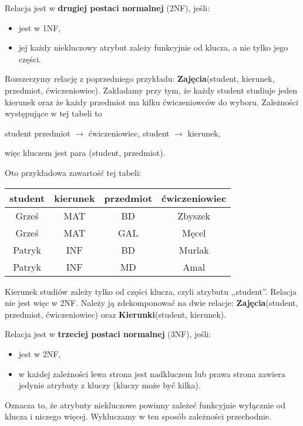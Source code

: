 Relacja jest w \textbf{drugiej postaci normalnej} (2NF), jeśli:
\begin{itemize}
    \item jest w 1NF,
    \item jej każdy niekluczowy atrybut zależy funkcyjnie od  klucza, a nie tylko jego części.
\end{itemize}

\begin{example}
Rozszerzymy relację z poprzedniego przykładu: \textbf{Zajęcia}(student, kierunek, przedmiot, ćwiczeniowiec). Zakładamy przy tym, że każdy student studiuje jeden kierunek oraz że każdy przedmiot ma kilku ćwiczeniowców do wyboru. Zależności występujące w tej tabeli to
\begin{center}
    student przedmiot $\to$ ćwiczeniowiec,
    \qquad student $\to$ kierunek,
\end{center}
więc kluczem jest para (student, przedmiot).

Oto przykładowa zawartość tej tabeli:
\begin{center}
    \begin{tabular}{c|c|c|c}
     student & kierunek & przedmiot & ćwiczeniowiec \\
     \hline
     Grześ & MAT & BD & Zbyszek \\
     Grześ & MAT & GAL & Męcel \\
     Patryk & INF & BD & Murlak \\
     Patryk & INF & MD & Amal \\
    \end{tabular}
\end{center}

Kierunek studiów zależy tylko od części klucza, czyli atrybutu ,,student''. Relacja nie jest więc w 2NF. Należy ją zdekomponować na dwie relacje: \textbf{Zajęcia}(student, przedmiot, ćwiczeniowiec) oraz \textbf{Kierunki}(student, kierunek).
\end{example}

Relacja jest w \textbf{trzeciej postaci normalnej} (3NF), jeśli:
\begin{itemize}
    \item jest w 2NF,
    \item w każdej zależności lewa strona jest nadkluczem lub prawa strona zawiera jedynie atrybuty z kluczy (kluczy może być kilka).
\end{itemize}

Oznacza to, że atrybuty niekluczowe powinny zależeć funkcyjnie wyłącznie od klucza i niczego więcej. Wykluczamy w ten sposób zależności przechodnie.

